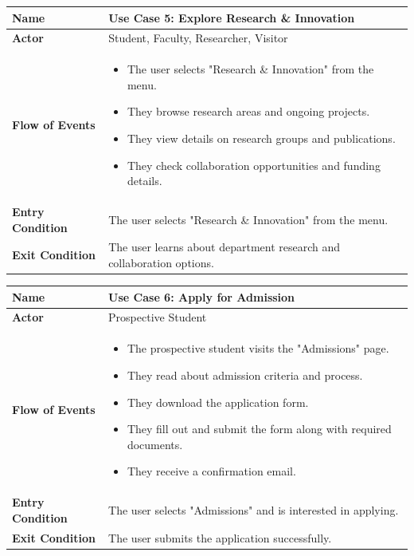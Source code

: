 \documentclass[11pt]{article}
\begin{document}
\begin{center}
\begin{tabular}{ | >{\bfseries}m{6em} | m{10cm} | }
  \hline
  \textbf{Name} & Use Case 5: Explore Research \& Innovation \\
  \hline
  \textbf{Actor} & Student, Faculty, Researcher, Visitor \\
  \hline
  \textbf{Flow of Events} & 
  \begin{itemize}
      \item The user selects "Research \& Innovation" from the menu.
      \item They browse research areas and ongoing projects.
      \item They view details on research groups and publications.
      \item They check collaboration opportunities and funding details.
  \end{itemize} \\
  \hline
  \textbf{Entry Condition} & The user selects "Research \& Innovation" from the menu. \\
  \hline
  \textbf{Exit Condition} & The user learns about department research and collaboration options. \\
  \hline
\end{tabular}
\end{center}

\begin{center}
\begin{tabular}{ | >{\bfseries}m{6em} | m{10cm} | }
  \hline
  \textbf{Name} & Use Case 6: Apply for Admission \\
  \hline
  \textbf{Actor} & Prospective Student \\
  \hline
  \textbf{Flow of Events} & 
  \begin{itemize}
      \item The prospective student visits the "Admissions" page.
      \item They read about admission criteria and process.
      \item They download the application form.
      \item They fill out and submit the form along with required documents.
      \item They receive a confirmation email.
  \end{itemize} \\
  \hline
  \textbf{Entry Condition} & The user selects "Admissions" and is interested in applying. \\
  \hline
  \textbf{Exit Condition} & The user submits the application successfully. \\
  \hline
\end{tabular}
\end{center}
\end{document}

